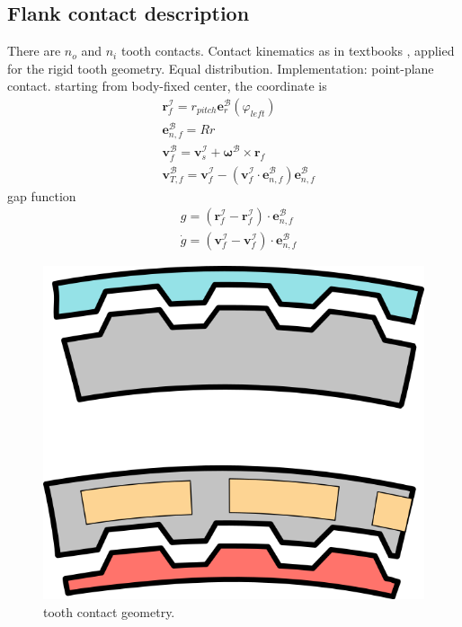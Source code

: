 \documentclass[a4paper,fleqn]{cas-dc}
\begin{document}
\subsection{Flank contact description}
There are $n_o$ and $n_i$ tooth contacts. Contact kinematics as in textbooks \cite{willner2013kontinuums}, applied for the rigid tooth geometry. 
Equal distribution. Implementation: point-plane contact. 
starting from body-fixed center, the coordinate is
\begin{align}
	& \boldsymbol{r}_f^{\mathcal{I}} = r_{pitch} \boldsymbol{e}_r^{\mathcal{B}} \left(\varphi_{left}\right) \\
	& \boldsymbol{e}_{n,f}^{\mathcal{B}} = R r\\
	& \boldsymbol{v}_f^{\mathcal{B}}  = \boldsymbol{v}_s ^{\mathcal{I}} + \boldsymbol{\omega}^{\mathcal{B}}\times \boldsymbol{r}_f\\
	& \boldsymbol{v}_{T,f}^{\mathcal{B}} = \boldsymbol{v}_f ^{\mathcal{I}}- \left(\boldsymbol{v}_f ^{\mathcal{I}}\cdot \boldsymbol{e}_{n,f}^{\mathcal{B}} \right)\boldsymbol{e}_{n,f}^{\mathcal{B}}
\end{align}
gap function \cite{willner2013kontinuums}
\begin{align}
	& g = \left(\boldsymbol{r}_f^{\mathcal{I}}-\boldsymbol{r}_f^{\mathcal{I}}\right)\cdot \boldsymbol{e}_{n,f}^{\mathcal{B}}\\
	& \dot g = \left(\boldsymbol{v}_f^{\mathcal{I}}-\boldsymbol{v}_f^{\mathcal{I}}\right)\cdot \boldsymbol{e}_{n,f}^{\mathcal{B}}
\end{align}
\begin{figure}
	\centering
	\includegraphics[scale=.75]{figs/toothcontacts.png}
	\caption{tooth contact geometry.}
	\label{fig:teeth}
\end{figure}\\
\end{document}
